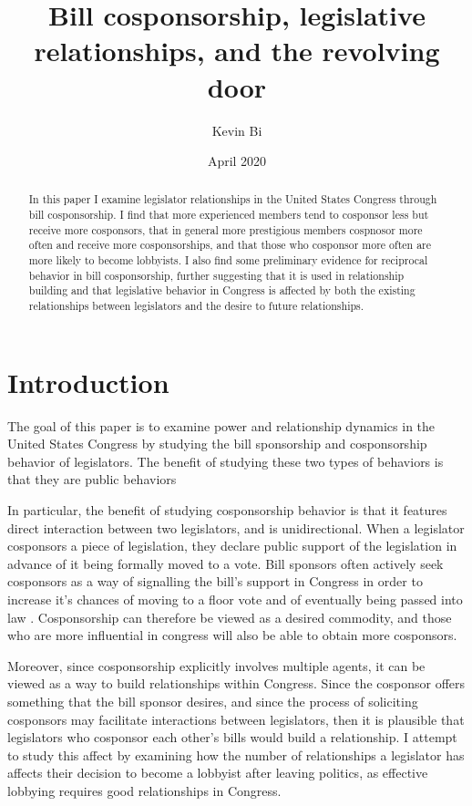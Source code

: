 \documentclass{article}
\title{Bill cosponsorship, legislative relationships, and the revolving door}
\author{Kevin Bi}
\date{April 2020}
\begin{document}
\maketitle

\begin{abstract}
  \noindent In this paper I examine legislator relationships in the United States Congress through bill cosponsorship. I find that more experienced members tend to cosponsor less but receive more cosponsors, that in general more prestigious members cospnosor more often and receive more cosponsorships, and that those who cosponsor more often are more likely to become lobbyists. I also find some preliminary evidence for reciprocal behavior in bill cosponsorship, further suggesting that it is used in relationship building and that legislative behavior in Congress is affected by both the existing relationships between legislators and the desire to future relationships. 
\end{abstract}
\section{Introduction}
The goal of this paper is to examine power and relationship dynamics in the United States Congress by studying the bill sponsorship and cosponsorship behavior of legislators. The benefit of studying these two types of behaviors is that they are public behaviors 


In particular, the benefit of studying cosponsorship behavior is that it features direct interaction between two legislators, and is unidirectional. When a legislator cosponsors a piece of legislation, they declare public support of the legislation in advance of it being formally moved to a vote. Bill sponsors often actively seek cosponsors as a way of signalling the bill's support in Congress in order to increase it's chances of moving to a floor vote and of eventually being passed into law \cite{crs_sponsorship}. Cosponsorship can therefore be viewed as a desired commodity, and those who are more influential in congress will also be able to obtain more cosponsors. 

Moreover, since cosponsorship explicitly involves multiple agents, it can be viewed as a way to build relationships within Congress. Since the cosponsor offers something that the bill sponsor desires, and since the process of soliciting cosponsors may facilitate interactions between legislators, then it is plausible that legislators who cosponsor each other's bills would build a relationship. I attempt to study this affect by examining how the number of relationships a legislator has affects their decision to become a lobbyist after leaving politics, as effective lobbying requires good relationships in Congress. 
\end{document}
